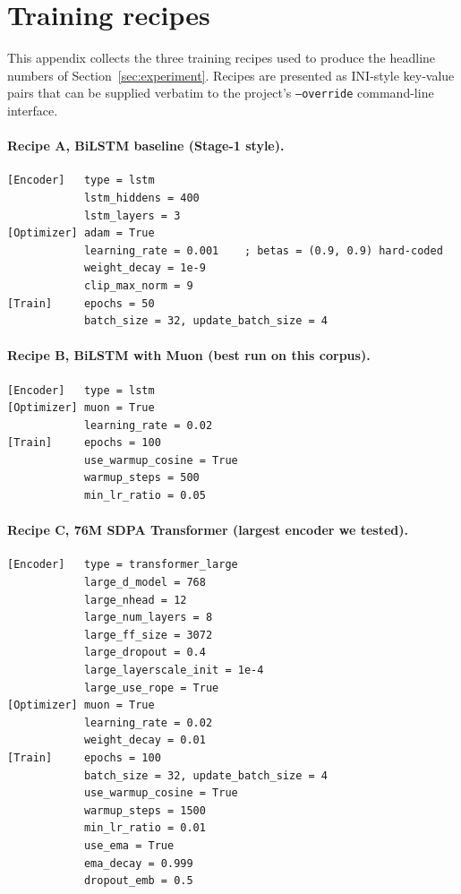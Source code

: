 \section{Training recipes}
\label{app:recipes}

This appendix collects the three training recipes used to produce the headline numbers of Section~\ref{sec:experiment}. Recipes are presented as INI-style key-value pairs that can be supplied verbatim to the project's \texttt{--override} command-line interface.

\paragraph{Recipe A, BiLSTM baseline (Stage-1 style).}

\begin{verbatim}
[Encoder]   type = lstm
            lstm_hiddens = 400
            lstm_layers = 3
[Optimizer] adam = True
            learning_rate = 0.001    ; betas = (0.9, 0.9) hard-coded
            weight_decay = 1e-9
            clip_max_norm = 9
[Train]     epochs = 50
            batch_size = 32, update_batch_size = 4
\end{verbatim}

\paragraph{Recipe B, BiLSTM with Muon (best run on this corpus).}

\begin{verbatim}
[Encoder]   type = lstm
[Optimizer] muon = True
            learning_rate = 0.02
[Train]     epochs = 100
            use_warmup_cosine = True
            warmup_steps = 500
            min_lr_ratio = 0.05
\end{verbatim}

\paragraph{Recipe C, 76M SDPA Transformer (largest encoder we tested).}

\begin{verbatim}
[Encoder]   type = transformer_large
            large_d_model = 768
            large_nhead = 12
            large_num_layers = 8
            large_ff_size = 3072
            large_dropout = 0.4
            large_layerscale_init = 1e-4
            large_use_rope = True
[Optimizer] muon = True
            learning_rate = 0.02
            weight_decay = 0.01
[Train]     epochs = 100
            batch_size = 32, update_batch_size = 4
            use_warmup_cosine = True
            warmup_steps = 1500
            min_lr_ratio = 0.01
            use_ema = True
            ema_decay = 0.999
            dropout_emb = 0.5
\end{verbatim}
